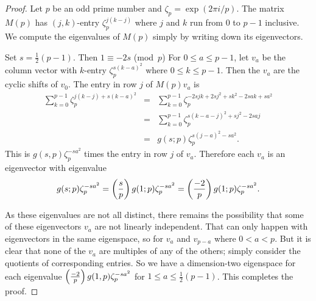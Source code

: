 \begin{proof}
Let $p$ be an odd prime number and $\zeta_p=\exp(2\pi i/p)$. The matrix
$M(p)$ has $(j,k)$-entry $\zeta_p^{j(k-j)}$ where $j$ and
$k$ run from $0$ to $p-1$ inclusive.  We compute the eigenvalues
of $M(p)$ simply by writing down its eigenvectors.

Set $s=\frac12(p-1)$. Then $1\equiv-2s$ (mod~$p$)
For $0\le a\le p-1$, let $v_a$ be the column vector with $k$-entry
$\zeta_p^{s(k-a)^2}$ where $0\le k\le p-1$. Then the $v_a$ are the cyclic shifts of
$v_0$. The entry in row $j$ of $M(p)v_a$ is
\begin{eqnarray*}
\sum_{k=0}^{p-1}\zeta_p^{j(k-j)+s(k-a)^2}
&=&\sum_{k=0}^{p-1}\zeta_p^{-2sjk+2sj^2+sk^2-2sak+sa^2}\\
&=&\sum_{k=0}^{p-1}\zeta_p^{s(k-a-j)^2+sj^2-2saj}\\
&=&g(s;p)\zeta_p^{s(j-a)^2-sa^2}.
\end{eqnarray*}
This is $g(s,p)\zeta_p^{-sa^2}$ times the entry in row $j$ of $v_a$.
Therefore each $v_a$ is an eigenvector with eigenvalue
$$g(s;p)\zeta_p^{-sa^2}=\left(\frac{s}{p}\right) g(1;p)\zeta_p^{-sa^2}
=\left(\frac{-2}{p}\right) g(1;p)\zeta_p^{-sa^2}.$$

As these eigenvalues are not all distinct, there remains the possibility
that some of these eigenvectors $v_a$ are not linearly independent.
That can only happen with eigenvectors in the same eigenspace, so
for $v_a$ and $v_{p-a}$ where $0<a<p$. But it is clear that none
of the $v_a$ are multiples of any of the others; simply consider
the quotients of corresponding entries. So we have a dimension-two
eigenspace for each eigenvalue $\left(\frac{-2}{p}\right) g(1,p)\zeta_p^{-sa^2}$
for $1\le a\le\frac12(p-1)$. This completes the proof.
\end{proof}


